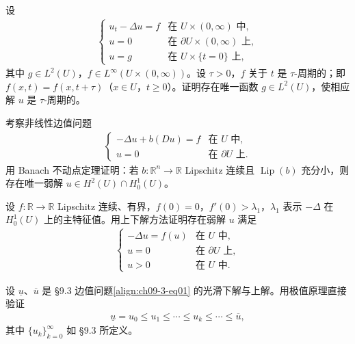 \documentclass[../../main.tex]{subfiles}
\begin{document}
\begin{exercise}[时间周期解]\label{exercise:ch09-7-4}设
\begin{align*}
\begin{cases}
u_t-\Delta u=f&\text{在 }U\times(0,\infty)\text{ 中},\\
u=0&\text{在 }\partial U\times(0,\infty)\text{ 上},\\
u=g&\text{在 }U\times\{t=0\}\text{ 上},
\end{cases}
\end{align*}
其中 $g\in L^2(U)$，$f\in L^\infty(U\times(0,\infty))$。设 $\tau>0$，$f$ 关于 $t$ 是 $\tau$-周期的；即 $f(x,t)=f(x,t+\tau)$（$x\in U$，$t\geqslant 0$）。证明存在唯一函数 $g\in L^2(U)$，使相应解 $u$ 是 $\tau$-周期的。
\end{exercise}

\begin{exercise}\label{exercise:ch09-7-5}
考察非线性边值问题
\begin{align*}
\begin{cases}
-\Delta u+b(Du)=f&\text{在 }U\text{ 中},\\
u=0&\text{在 }\partial U\text{ 上}.
\end{cases}
\end{align*}
用 Banach 不动点定理证明：若 $b:\mathbb{R}^n\to\mathbb{R}$ Lipschitz 连续且 $\operatorname{Lip}(b)$ 充分小，则存在唯一弱解 $u\in H^2(U)\cap H_0^1(U)$。
\end{exercise}

\begin{exercise}\label{exercise:ch09-7-6}
设 $f:\mathbb{R}\to\mathbb{R}$ Lipschitz 连续、有界，$f(0)=0$，$f'(0)>\lambda_1$，$\lambda_1$ 表示 $-\Delta$ 在 $H_0^1(U)$ 上的主特征值。用上下解方法证明存在弱解 $u$ 满足
\begin{align*}
\begin{cases}
-\Delta u=f(u)&\text{在 }U\text{ 中},\\
u=0&\text{在 }\partial U\text{ 上},\\
u>0&\text{在 }U\text{ 中}.
\end{cases}
\end{align*}
\end{exercise}

\begin{exercise}\label{exercise:ch09-7-7}
设 $\underline{u}$、$\overline{u}$ 是 \S9.3 边值问题\eqref{align:ch09-3-eq01} 的光滑下解与上解。用极值原理直接验证
\begin{align*}
\underline{u}=u_0\leqslant u_1\leqslant\cdots\leqslant u_k\leqslant\cdots\leqslant\overline{u},
\end{align*}
其中 $\{u_k\}_{k=0}^\infty$ 如 \S9.3 所定义。
\end{exercise}
\end{document}
